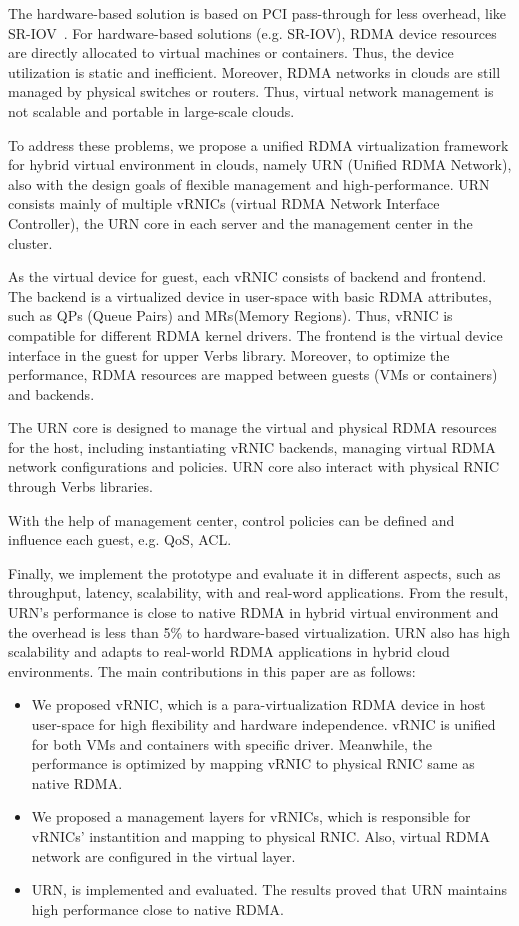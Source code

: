 The hardware-based solution is based on PCI pass-through for less overhead, like SR-IOV~\cite{sr-iov}. For hardware-based solutions (e.g. SR-IOV), RDMA device resources are directly allocated to virtual machines or containers. Thus, the device utilization is static and inefficient. Moreover, RDMA networks in clouds are still managed by physical switches or routers. Thus, virtual network management is not scalable and portable in large-scale clouds.

To address these problems, we propose a unified RDMA virtualization framework for hybrid virtual environment in clouds, namely URN (Unified RDMA Network), also with the design goals of flexible management and high-performance. URN consists mainly of multiple vRNICs (virtual RDMA Network Interface Controller), the URN core in each server and the management center in the cluster.

As the virtual device for guest, each vRNIC consists of backend and frontend. The backend is a virtualized device in user-space with basic RDMA attributes, such as QPs (Queue Pairs) and MRs(Memory Regions). Thus, vRNIC is compatible for different RDMA kernel drivers. The frontend is the virtual device interface in the guest for upper Verbs library. Moreover, to optimize the performance, RDMA resources are mapped between guests (VMs or containers) and backends. 

The URN core is designed to manage the virtual and physical RDMA resources for the host, including instantiating vRNIC backends, managing virtual RDMA network configurations and policies. URN core also interact with physical RNIC through Verbs libraries. 

With the help of management center, control policies can be defined and influence each guest, e.g. QoS, ACL. 

Finally, we implement the prototype and evaluate it in different aspects, such as throughput, latency, scalability, with and real-word applications. From the result, URN's performance is close to native RDMA in hybrid virtual environment and the overhead is less than 5\% to hardware-based virtualization. URN also has high scalability and adapts to real-world RDMA applications in hybrid cloud environments. The main contributions in this paper are as follows:

\begin{itemize}
\item We proposed vRNIC, which is a para-virtualization RDMA device in host user-space for high flexibility and hardware independence. vRNIC is unified for both VMs and containers with specific driver. Meanwhile, the performance is optimized by mapping vRNIC to physical RNIC same as native RDMA.

\item We proposed a management layers for vRNICs, which is responsible for vRNICs' instantition and mapping to physical RNIC. Also, virtual RDMA network are configured in the virtual layer.

\item URN, is implemented and evaluated. The results proved that URN maintains high performance close to native RDMA.
\end{itemize}

